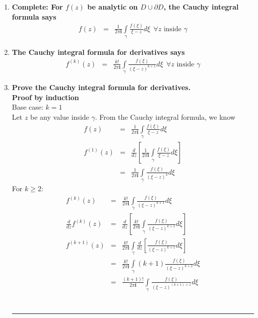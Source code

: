 \documentclass{article}%
\newcommand\I{\textbf{i}}
\newenvironment{proof}[1][]{\textbf{Proof #1} \\ }{\\ \rule{0.5em}{0.5em}  \\}
\begin{document}
\begin{enumerate}
\begin{enumerate}[label=\alph*)]
        \item %
        \textbf{Complete: For $f(z)$ be analytic on $D\cup\partial D$, the Cauchy integral formula says} \\
        \begin{eqnarray*}
            f(z) &=& \frac{1}{2\pi\I} \int\limits_{\gamma}{\frac{f(\xi)}{\xi - z} d\xi} ~~\forall z \text{ inside } \gamma
        \end{eqnarray*}
        \item %
        \textbf{The Cauchy integral formula for derivatives says}
        \begin{eqnarray*}
            f^{(k)}(z) &=& \frac{k!}{2\pi\I}\int\limits_{\gamma}{\frac{f(\xi)}{(\xi - z)^{k+1}} d\xi} ~~\forall z \text{ inside } \gamma
        \end{eqnarray*}
        \item %
        \textbf{Prove the Cauchy integral formula for derivatives.} \\
        \begin{proof}[by induction]
            Base case: $k = 1$\\
            Let $z$ be any value inside $\gamma$. From the Cauchy integral formula, we know
            \begin{eqnarray*}
                f(z) &=& \frac{1}{2\pi\I} \int\limits_{\gamma}{\frac{f(\xi)}{\xi - z} d\xi} \\
                f^{(1)}(z) &=& \frac{d}{dz}\left[\frac{1}{2\pi\I} \int\limits_{\gamma}{\frac{f(\xi)}{\xi - z} d\xi}\right] \\
                           &=& \frac{1}{2\pi\I}\int\limits_{\gamma}{\frac{f(\xi)}{(\xi - z)^2} d\xi}
            \end{eqnarray*}
            For $k\geq2$:
            \begin{eqnarray*}
                f^{(k)}(z) &=& \frac{k!}{2\pi\I}\int\limits_{\gamma}{\frac{f(\xi)}{(\xi - z)^{k+1}} d\xi} \\
                \frac{d}{dz} f^{(k)}(z) &=& \frac{d}{dz}\left[\frac{k!}{2\pi\I}\int\limits_{\gamma}{\frac{f(\xi)}{(\xi - z)^{k+1}} d\xi} \right]\\
                f^{(k+1)}(z) &=& \frac{k!}{2\pi\I}\int\limits_{\gamma}{\frac{d}{dz}\left[\frac{f(\xi)}{(\xi - z)^{k+1}} d\xi \right]} \\
                           &=& \frac{k!}{2\pi\I}\int\limits_{\gamma}{(k+1)\frac{f(\xi)}{(\xi - z)^{k+2}} d\xi} \\
                           &=& \frac{(k+1)!}{2\pi\I}\int\limits_{\gamma}{\frac{f(\xi)}{(\xi - z)^{(k+1)+1}} d\xi} \\

\end{eqnarray*}
\end{proof}
\end{enumerate}
\end{enumerate}
\end{document}
